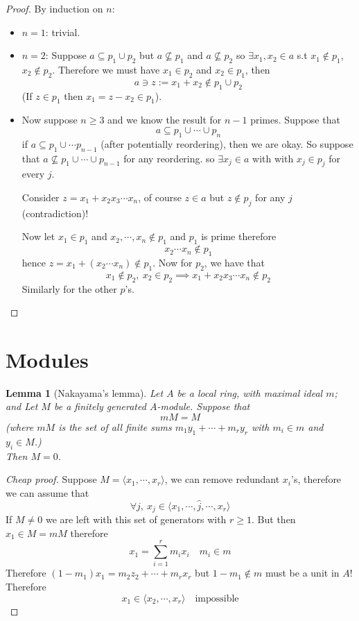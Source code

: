 \documentclass[11pt,a4paper]{article}
\theoremstyle{definition}
\theoremstyle{plain}
\newtheorem{lemma}[definition]{Lemma}
\theoremstyle{remark}
\newcommand{\angles}[1]{\langle #1 \rangle}
\begin{document}
\begin{proof}
    By induction on $n$: 
    \begin{itemize}
        \item $n = 1$: trivial. 
        \item $n = 2$: Suppose $a \subseteq p_1 \cup p_2$ but $a \not\subseteq p_1$ and $a \not\subseteq p_2$ so $\exists x_1, x_2 \in a$ s.t $x_1 \not\in p_1$, 
        $x_2 \not\in p_2$. Therefore we must have $x_1 \in p_2$ and $x_2 \in p_1$, then 
        $$a \ni z := x_1 + x_2 \not\in p_1 \cup p_2$$
        (If $z \in p_1$ then $x_1 = z - x_2 \in p_1$). 
        \item Now suppose $n \geq 3$ and we know the result for $n-1$ primes. Suppose that 
        $$a \subseteq p_1 \cup \cdots \cup p_n$$
        if $a \subseteq p_1 \cup \cdots p_{n-1}$ (after potentially reordering), then we are okay. 
        So suppose that $a \not\subseteq p_1 \cup \cdots \cup p_{n-1}$ for any reordering. so $\exists x_j \in a$ with 
        with $x_j \in p_j$ for every $j$. 
        
        Consider $z = x_1 + x_2 x_3 \cdots x_n$, of course $z \in a$ but $z \not\in p_j$ for any $j$ (contradiction)!
        
        Now let $x_1 \in p_1$ and $x_2, \cdots, x_n \not\in p_1$ and $p_1$ is prime therefore 
        $$x_2 \cdots x_n \not\in p_1$$
        hence $z = x_1 + (x_2 \cdots x_n) \not\in p_1$. Now for $p_2$, we have that 
        $$x_1 \not\in p_2, \ x_2 \in p_2 \implies x_1 + x_2 x_3 \cdots x_n \not\in p_2$$
        Similarly for the other $p$'s. 
    \end{itemize}
\end{proof}

\section{Modules}
\begin{lemma}[Nakayama's lemma]
    Let $A$ be a local ring, with maximal ideal $m$; and Let $M$ be a finitely generated $A$-module. Suppose that 
    $$m M = M$$
    (where $m M$ is the set of all finite sums $m_1 y_1 + \cdots + m_r y_r$ with $m_i \in m$ and $y_i \in M$.)\\
    Then $M = 0$.      
\end{lemma}

\begin{proof}[Cheap proof]
    Suppose $M = \angles{x_1, \cdots, x_r}$, we can remove redundant $x_i$'s, therefore we can assume that 
    $$\forall j, \ x_j \in \angles{x_1, \cdots, \hat{j}, \cdots, x_r}$$
    If $M \neq 0$ we are left with this set of generators with $r \ge 1$. 
    But then $x_1 \in M = m M$ therefore 
    $$x_1 = \sum_{i=1}^r m_i x_i \quad m_i \in m$$
    Therefore $(1- m_1) x_1 = m_2 z_2 + \cdots + m_r x_r$ but $1 - m_1 \not\in m$ must be a unit in $A$! Therefore 
    $$x_1 \in \angles{x_2,\cdots, x_r} \quad \text{impossible}$$     
\end{proof}
\end{document}
